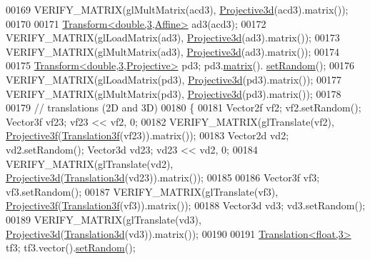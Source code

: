 \begin{DoxyCode}
00169   VERIFY\_MATRIX(glMultMatrix(acd3), \hyperlink{group___geometry___module_gab9cec8c457da930391eb73370e07aaae}{Projective3d}(acd3).matrix());
00170   
00171   \hyperlink{group___geometry___module_class_eigen_1_1_transform}{Transform<double,3,Affine>} ad3(acd3);
00172   VERIFY\_MATRIX(glLoadMatrix(ad3), \hyperlink{group___geometry___module_gab9cec8c457da930391eb73370e07aaae}{Projective3d}(ad3).matrix());
00173   VERIFY\_MATRIX(glMultMatrix(ad3), \hyperlink{group___geometry___module_gab9cec8c457da930391eb73370e07aaae}{Projective3d}(ad3).matrix());
00174   
00175   \hyperlink{group___geometry___module_class_eigen_1_1_transform}{Transform<double,3,Projective>} pd3; pd3.\hyperlink{group___geometry___module_aec8168000a88a807130d41020af98d47}{matrix}().
      \hyperlink{class_eigen_1_1_plain_object_base_af0e576a0e1aefc9ee346de44cc352ba3}{setRandom}();
00176   VERIFY\_MATRIX(glLoadMatrix(pd3), \hyperlink{group___geometry___module_gab9cec8c457da930391eb73370e07aaae}{Projective3d}(pd3).matrix());
00177   VERIFY\_MATRIX(glMultMatrix(pd3), \hyperlink{group___geometry___module_gab9cec8c457da930391eb73370e07aaae}{Projective3d}(pd3).matrix());
00178   
00179   \textcolor{comment}{// translations (2D and 3D)}
00180   \{
00181     Vector2f vf2; vf2.setRandom(); Vector3f vf23; vf23 << vf2, 0;
00182     VERIFY\_MATRIX(glTranslate(vf2), \hyperlink{group___geometry___module_gab14804071b7486b6666f3d324475a478}{Projective3f}(\hyperlink{group___geometry___module_class_eigen_1_1_translation}{Translation3f}(vf23)).matrix());
00183     Vector2d vd2; vd2.setRandom(); Vector3d vd23; vd23 << vd2, 0;
00184     VERIFY\_MATRIX(glTranslate(vd2), \hyperlink{group___geometry___module_gab9cec8c457da930391eb73370e07aaae}{Projective3d}(\hyperlink{group___geometry___module_class_eigen_1_1_translation}{Translation3d}(vd23)).matrix());
00185     
00186     Vector3f vf3; vf3.setRandom();
00187     VERIFY\_MATRIX(glTranslate(vf3), \hyperlink{group___geometry___module_gab14804071b7486b6666f3d324475a478}{Projective3f}(\hyperlink{group___geometry___module_class_eigen_1_1_translation}{Translation3f}(vf3)).matrix());
00188     Vector3d vd3; vd3.setRandom();
00189     VERIFY\_MATRIX(glTranslate(vd3), \hyperlink{group___geometry___module_gab9cec8c457da930391eb73370e07aaae}{Projective3d}(\hyperlink{group___geometry___module_class_eigen_1_1_translation}{Translation3d}(vd3)).matrix());
00190     
00191     \hyperlink{group___geometry___module_class_eigen_1_1_translation}{Translation<float,3>} tf3; tf3.vector().\hyperlink{class_eigen_1_1_plain_object_base_af0e576a0e1aefc9ee346de44cc352ba3}{setRandom}();

\end{DoxyCode}

